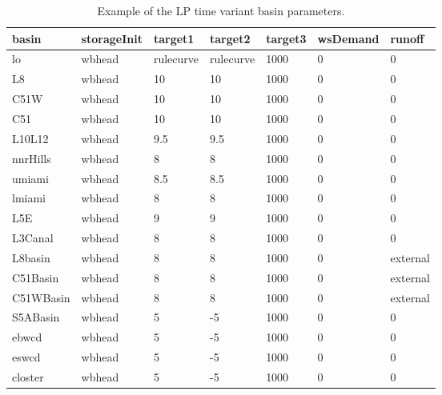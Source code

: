 \begin{table}[!htb]
 \begin{center}
  \footnotesize
  \caption{Example of the LP time variant basin parameters. }\label{TVbasinPara}
  \begin{tabular}{p{2.3cm}p{1.8cm}p{1.8cm}p{1.8cm}p{1.8cm}p{1.8cm}p{1.8cm}}         \\[0.8ex]
   basin          &storageInit &target1   &target2   &target3   &wsDemand &runoff   \\
  \hline
  lo              &wbhead      &rulecurve &rulecurve & 1000     & 0       & 0       \\
  L8              &wbhead      & 10       & 10       & 1000     & 0       & 0       \\
  C51W            &wbhead      & 10       & 10       & 1000     & 0       & 0       \\
  C51             &wbhead      & 10       & 10       & 1000     & 0       & 0       \\
  L10L12          &wbhead      & 9.5      & 9.5      & 1000     & 0       & 0       \\
  nnrHills        &wbhead      & 8        & 8        & 1000     & 0       & 0       \\
  umiami          &wbhead      & 8.5      & 8.5      & 1000     & 0       & 0       \\
  lmiami          &wbhead      & 8        & 8        & 1000     & 0       & 0       \\
  L5E             &wbhead      & 9        & 9        & 1000     & 0       & 0       \\
  L3Canal         &wbhead      & 8        & 8        & 1000     & 0       & 0       \\
  L8basin         &wbhead      & 8        & 8        & 1000     & 0       &external \\
  C51Basin        &wbhead      & 8        & 8        & 1000     & 0       &external \\
  C51WBasin       &wbhead      & 8        & 8        & 1000     & 0       &external \\
  S5ABasin        &wbhead      & 5        & -5       & 1000     & 0       & 0       \\
  ebwcd           &wbhead      & 5        & -5       & 1000     & 0       & 0       \\
  eswcd           &wbhead      & 5        & -5       & 1000     & 0       & 0       \\
  closter         &wbhead      & 5        & -5       & 1000     & 0       & 0       \\

\end{tabular}
\end{center}
\end{table}

